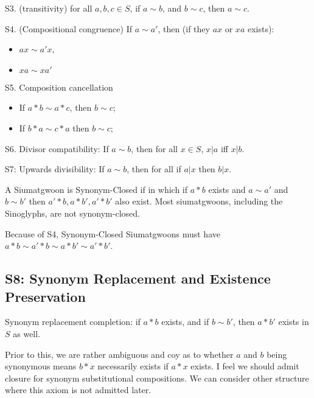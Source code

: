 \begin{axiom}[Transitivity]\label{ax:syn-trans}
S3. (transitivity) for all $a,b,c \in S$, if $a\sim b$, and $b \sim c$, then $a \sim c$.
\end{axiom}

\begin{axiom}\label{ax:syn-comp}
S4. (Compositional congruence) If $a \sim a'$, then (if they $ax$ or $xa$ exists):
\begin{itemize}
\item $ax \sim a'x$,
\item $xa \sim xa'$
\end{itemize}
\end{axiom}

\begin{axiom}\label{ax:syn-cancel}
S5. Composition cancellation
\begin{itemize}
\item If $a * b \sim a * c$, then $b \sim c$;
\item If $b*a\sim c*a$ then $b \sim c$;
\end{itemize}
\end{axiom}

\begin{axiom}\label{ax:syn-div}
S6. Divisor compatibility: If $a \sim b$, then for all $x \in S$, $x|a$ iff $x|b$.
\end{axiom}

\begin{axiom}\label{ax:syn-up}
S7: Upwards divisibility: If $a\sim b$, then for all if $a|x$ then $b|x$.
\end{axiom}

A Siumatgwoon is Synonym-Closed if in which if $a*b$ exists and $a\sim a'$ and $b\sim b'$ then $a'*b, a*b', a'*b'$ also exist. Most siumatgwoons, including the Sinoglyphs, are not synonym-closed. 

Because of S4, Synonym-Closed Siumatgwoons must have $a*b \sim a'*b \sim a*b'\sim a'*b'$.

\subsection{S8: Synonym Replacement and Existence Preservation}

Synonym replacement completion: if $a*b$ exists, and if $b\sim b'$, then $a*b'$ exists in $S$ as well.

Prior to this, we are rather ambiguous and coy as to whether $a$ and $b$ being synonymous means $b*x$ necessarily exists if $a*x$ exists. I feel we should admit closure for synonym substitutional compositions. We can consider other structure where this axiom is not admitted later.


